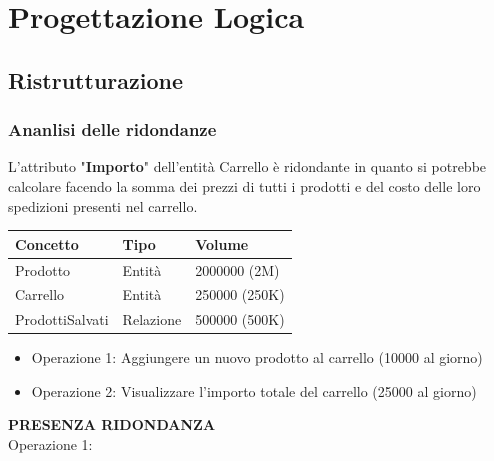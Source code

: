 \documentclass[11pt]{article}
\begin{document}
\section{Progettazione Logica}

\subsection{Ristrutturazione}

\subsubsection{Ananlisi delle ridondanze}

L'attributo "\textbf{Importo}" dell'entità Carrello è ridondante in quanto si potrebbe calcolare facendo la somma dei prezzi
di tutti i prodotti e del costo delle loro spedizioni presenti nel carrello.

\begin{tabularx}{0.98\textwidth} {
        | >{\raggedright\arraybackslash}X |
          >{\raggedright\arraybackslash}X |
          >{\raggedright\arraybackslash}X |
      }

        \hline
        \textbf{Concetto} & \textbf{Tipo} & \textbf{Volume} \\
        \hline

        Prodotto  &
        Entità &
        2000000 (2M) \\
        \hline

        Carrello  &
        Entità &
        250000 (250K) \\
        \hline

        ProdottiSalvati  &
        Relazione &
        500000 (500K) \\
        \hline
    
\end{tabularx}

\begin{itemize}
    \item Operazione 1: Aggiungere un nuovo prodotto al carrello (10000 al giorno)
    \item Operazione 2: Visualizzare l'importo totale del carrello (25000 al giorno)
\end{itemize}
\textbf{PRESENZA RIDONDANZA}\\
Operazione 1:
\end{document}
